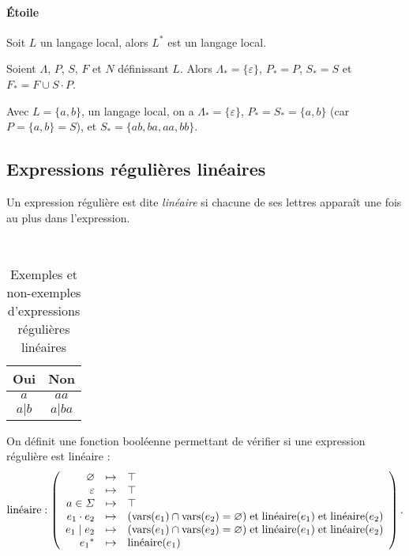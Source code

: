 \paragraph{Étoile}

\begin{prop}
	Soit $L$\/ un langage local, alors $L^*$\/ est un langage local.
\end{prop}

\begin{prv}
	Soient $\Lambda$, $P$, $S$, $F$\/ et $N$\/ définissant $L$.
	Alors $\Lambda_* = \{\varepsilon\}$, $P_* = P$, $S_* = S$\/ et $F_* = F \cup S\cdot P$.
\end{prv}

\begin{exm}
	Avec $L = \{a,b\}$, un langage local, on a $\Lambda_* = \{\varepsilon\}$, $P_* = S_* = \{a,b\}$\/ (car $P = \{a,b\} = S$), et $S_* = \{ab, ba, aa, bb\}$.
\end{exm}

\subsection{Expressions régulières linéaires}

\begin{defn}
	Un expression régulière est dite {\it linéaire}\/ si chacune de ses lettres apparaît une fois au plus dans l'expression.
\end{defn}

\begin{exm}
	~\\
	\begin{table}[H]
		\centering
		\begin{tabular}{|c|c|}
			\hline
			\sc Oui&\sc Non\\ \hline
			$a$&$aa$\\ \hline
			$a|b$&$a|ba$\\\hline
		\end{tabular}
		\caption{Exemples et non-exemples d'expressions régulières linéaires}
	\end{table}
\end{exm}

\begin{exm}
	On définit une fonction booléenne permettant de vérifier si une expression régulière est linéaire : \[
		\text{linéaire} :
		\left(\begin{array}{rcl}
			\varnothing&\mapsto&\top\\
			\varepsilon&\mapsto&\top\\
			a \in \varSigma&\mapsto&\top\\
			e_1 \cdot e_2&\mapsto& (\mathrm{vars}(e_1) \cap \mathrm{vars}(e_2) = \varnothing) \mathrel{\text{et}} \text{linéaire}(e_1) \mathrel{\text{et}} \text{linéaire}(e_2)\\
			e_1 \mid e_2&\mapsto& (\mathrm{vars}(e_1) \cap \mathrm{vars}(e_2) = \varnothing) \mathrel{\text{et}} \text{linéaire}(e_1) \mathrel{\text{et}} \text{linéaire}(e_2)\\
			{e_1}^*&\mapsto& \text{linéaire}(e_1)
		\end{array}\right)
	.\]
\end{exm}

